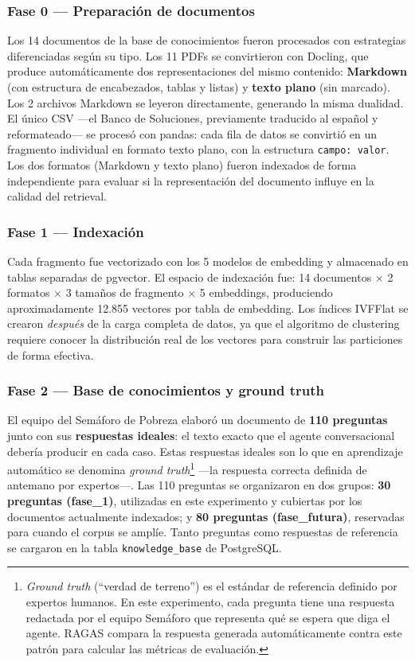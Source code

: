 \documentclass{article}
\begin{document}

\subsubsection*{Fase 0 — Preparación de documentos}

Los 14 documentos de la base de conocimientos fueron procesados con
estrategias diferenciadas según su tipo. Los 11 PDFs se convirtieron con
Docling, que produce automáticamente dos representaciones del mismo contenido:
\textbf{Markdown} (con estructura de encabezados, tablas y listas) y
\textbf{texto plano} (sin marcado). Los 2 archivos Markdown se leyeron
directamente, generando la misma dualidad. El único CSV —el Banco de
Soluciones, previamente traducido al español y reformateado— se procesó con
pandas: cada fila de datos se convirtió en un fragmento individual en formato
texto plano, con la estructura \texttt{campo: valor}. Los dos formatos
(Markdown y texto plano) fueron indexados de forma independiente para
evaluar si la representación del documento influye en la calidad del
retrieval.

\subsubsection*{Fase 1 — Indexación}

Cada fragmento fue vectorizado con los 5 modelos de embedding y almacenado
en tablas separadas de pgvector. El espacio de indexación fue:
14 documentos $\times$ 2 formatos $\times$ 3 tamaños de fragmento $\times$ 5
embeddings, produciendo aproximadamente 12.855 vectores por tabla de embedding.
Los índices IVFFlat se crearon \textit{después} de la carga completa de datos,
ya que el algoritmo de clustering requiere conocer la distribución real de los
vectores para construir las particiones de forma efectiva.

\subsubsection*{Fase 2 — Base de conocimientos y ground truth}

El equipo del Semáforo de Pobreza elaboró un documento de
\textbf{110 preguntas} junto con sus \textbf{respuestas ideales}: el texto
exacto que el agente conversacional debería producir en cada caso. Estas
respuestas ideales son lo que en aprendizaje automático se denomina
\textit{ground truth}\footnote{\textit{Ground truth} (``verdad de terreno'')
es el estándar de referencia definido por expertos humanos. En este
experimento, cada pregunta tiene una respuesta redactada por el equipo
Semáforo que representa qué se espera que diga el agente. RAGAS compara la
respuesta generada automáticamente contra este patrón para calcular las
métricas de evaluación.} —la respuesta correcta definida de antemano por
expertos—. Las 110 preguntas se organizaron en dos grupos: \textbf{30
preguntas (fase\_1)}, utilizadas en este experimento y cubiertas por los
documentos actualmente indexados; y \textbf{80 preguntas (fase\_futura)},
reservadas para cuando el corpus se amplíe. Tanto preguntas como respuestas
de referencia se cargaron en la tabla \texttt{knowledge\_base} de PostgreSQL.
\end{document}
